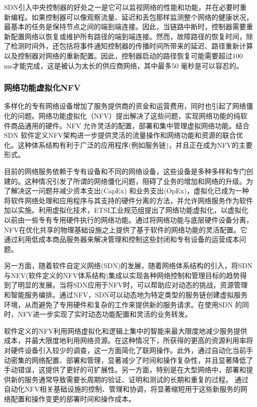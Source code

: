 SDN引入中央控制器的好处之一是它可以监视网络的性能和功能，并在必要时重新编程。如果控制器可以像观察流量、延迟和丢包那样监测整个网络的健康状况\cite{van2014opennetmon}，最基本的任务是保持节点之间的端到端连接。因此，当链路中断时，控制器需要重新配置网络以恢复或维护所有路径的端到端连接。然而，故障路径的恢复时间，除了检测时间外，还包括将事件通知控制器的传播时间所带来的延迟、路径重新计算以及控制器对网络的重新配置。因此，控制器启动的路径恢复可能需要超过100 ms才能完成，这是被认为太长的供应商网络，其中最多50 毫秒是可以容忍的\cite{niven2009requirements}。






\subsubsection{网络功能虚拟化NFV}
多样化的专有网络设备增加了服务提供商的资金和运营费用，同时也引起了网络僵化的问题。网络功能虚拟化（NFV）提出解决了这些问题，实现网络功能的纯软件商品通用的硬件。NFV 允许灵活的配置，部署和集中管理虚拟网络功能。结合SDN 软件定义NFV架构进一步提供灵活的流量操作和网络功能和资源的联合优化。这种体系结构有利于广泛的应用程序(例如服务链)，并且正在成为NFV的主要形式。

目前的网络服务依赖于专有设备和不同的网络设备，这些设备是多种多样和专门创建的\cite{sherry2012making,wang2011untold,walfish2004middleboxes}。这种情况引发了所谓的网络僵化问题，阻碍了业务的增加和网络的升级。为了解决这一问题并减少资本支出(CapEx) 和业务支出(OpEx)，虚拟化已成为一种将软件网络处理和应用程序与其支持的硬件分离的方法，并允许网络服务作为软件\cite{schaffrath2009network,chowdhury2010survey,chowdhury2009network} 加以实施。利用虚拟化技术，ETSI工业规范组提出了网络功能虚拟化，以虚拟化以前由一些专有专用硬件执行的网络功能\cite{chiosi2012network,yue2013network}。通过将网络功能与底层硬件设备分离，NFV在优化共享的物理基础设施之上提供了基于软件的网络功能的灵活配置。它通过利用低成本商品服务器来解决管理和控制这些封闭和专有设备的运营成本问题。

另一方面，随着软件自定义网络(SDN)的发展，随着网络体系结构\cite{manzalini2014software,yeganeh2013scalability,ge20145g}的引入，将SDN 与NFV(软件定义的NFV体系结构)集成以实现各种网络控制和管理目标的趋势得到了明显的发展。当将SDN应用于NFV时，可以帮助应对动态的挑战，资源管理和智能服务编排。通过NFV，SDN可以动态地为特定类型的服务链创建虚拟服务环境，从而避免了专用硬件和复杂的工作来提供新的服务请求。在使用SDN 的同时，NFV进一步实现了实时动态功能配置和灵活的业务转发。

软件定义的NFV利用网络虚拟化和逻辑上集中的智能来最大限度地减少服务提供成本，并最大限度地利用网络资源。在这种情况下，所获得的更高的资源利用率将对硬件设备引入较少的调查，这一方面简化了联网操作。此外，通过自动化当前手动密集的网络配置、部署和管理，显著减少了时间和操作复杂性，并且显著降低了手动错误，这提供了更好的可扩展性。另一方面，特别是在大型网络中，部署和提供新的服务通常导致需要长周期的验证、证明和测试的长期和重复的过程。
通过自动化NFV相关基础设施的控制、管理和协调，将显著缩短用于这些新服务的网络配置和操作变更的部署时间和操作成本。

